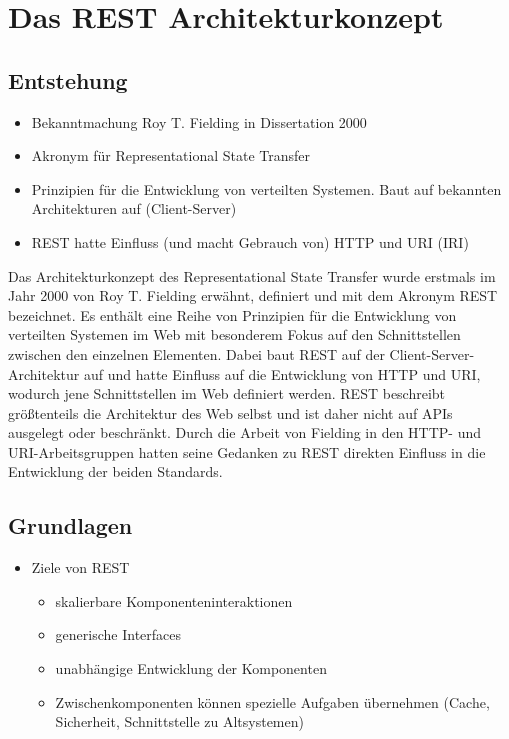 \chapter{Das REST Architekturkonzept}
\section{Entstehung}
\begin{itemize}
  \item Bekanntmachung Roy T. Fielding in Dissertation 2000
  \item Akronym für Representational State Transfer
  \item Prinzipien für die Entwicklung von verteilten Systemen. Baut auf bekannten Architekturen auf (Client-Server)
  \item REST hatte Einfluss (und macht Gebrauch von) HTTP und URI (IRI)
\end{itemize}
Das Architekturkonzept des Representational State Transfer wurde erstmals im Jahr 2000 von Roy T. Fielding erwähnt, definiert und mit dem Akronym REST bezeichnet.\cite[76]{REST}
Es enthält eine Reihe von Prinzipien für die Entwicklung von verteilten Systemen im Web mit besonderem Fokus auf den Schnittstellen zwischen den einzelnen Elementen.
Dabei baut REST auf der Client-Server-Architektur auf und hatte Einfluss auf die Entwicklung von HTTP und URI, wodurch jene Schnittstellen im Web definiert werden.\cite[vgl.][4,105f.]{REST}
REST beschreibt größtenteils die Architektur des Web selbst und ist daher nicht auf APIs ausgelegt oder beschränkt.
Durch die Arbeit von Fielding in den HTTP- und URI-Arbeitsgruppen hatten seine Gedanken zu REST direkten Einfluss in die Entwicklung der beiden Standards.\cite[107]{REST}

\section{Grundlagen}
\begin{itemize}
  \item Ziele von REST
  \begin{itemize}
    \item skalierbare Komponenteninteraktionen
    \item generische Interfaces
    \item unabhängige Entwicklung der Komponenten
    \item Zwischenkomponenten können spezielle Aufgaben übernehmen (Cache, Sicherheit, Schnittstelle zu Altsystemen)
  \end{itemize}
\end{itemize}
